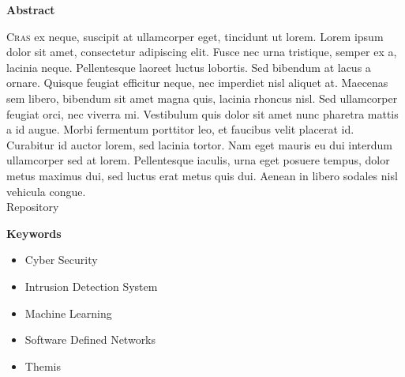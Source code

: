\thispagestyle{empty}

{\bf\Huge Abstract}

\vspace{1cm}

\lettrine{C}{ras} ex neque, suscipit at ullamcorper eget, tincidunt ut lorem. Lorem ipsum dolor sit amet, consectetur adipiscing elit. Fusce nec urna tristique, semper ex a, lacinia neque. Pellentesque laoreet luctus lobortis. Sed bibendum at lacus a ornare. Quisque feugiat efficitur neque, nec imperdiet nisl aliquet at. Maecenas sem libero, bibendum sit amet magna quis, lacinia rhoncus nisl. Sed ullamcorper feugiat orci, nec viverra mi. Vestibulum quis dolor sit amet nunc pharetra mattis a id augue. Morbi fermentum porttitor leo, et faucibus velit placerat id. Curabitur id auctor lorem, sed lacinia tortor. Nam eget mauris eu dui interdum ullamcorper sed at lorem. Pellentesque iaculis, urna eget posuere tempus, dolor metus maximus dui, sed luctus erat metus quis dui. Aenean in libero sodales nisl vehicula congue. \\
Repository \faGithub

\vspace{1cm}

{\bf\Huge Keywords}

\vspace{1cm}

\begin{itemize}
    \item Cyber Security
    \item Intrusion Detection System
    \item Machine Learning
    \item Software Defined Networks
    \item Themis
\end{itemize}